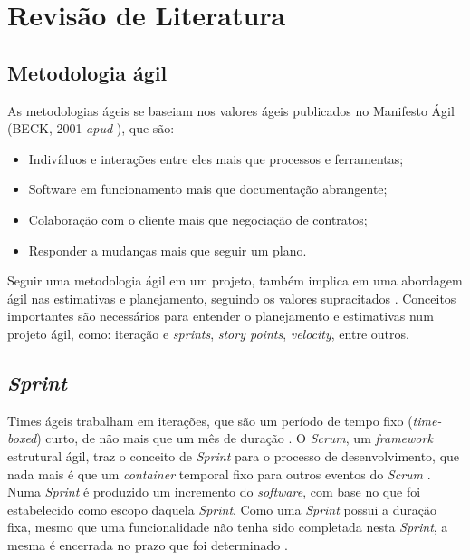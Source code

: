 \chapter{Revisão de Literatura}

  \section{Metodologia ágil}
 
  As metodologias ágeis se baseiam nos valores ágeis publicados no Manifesto Ágil
  (BECK, 2001 \textit{apud} ), que são:
  
  \begin{itemize}
   \item Indivíduos e interações entre eles mais que processos e ferramentas;
   \item Software em funcionamento mais que documentação abrangente;
   \item Colaboração com o cliente mais que negociação de contratos;
   \item Responder a mudanças mais que seguir um plano.
  \end{itemize}
  
 Seguir uma metodologia ágil em um projeto, também implica em uma abordagem ágil nas estimativas e planejamento, seguindo 
 os valores supracitados \cite{cohn06}. Conceitos importantes são necessários para entender o planejamento e estimativas
 num projeto ágil, como: iteração e \textit{sprints}, \textit{story points}, \textit{velocity}, entre outros.
 
 
  \section{\textit{Sprint}}
  
  Times ágeis trabalham em iterações, que são um período de tempo fixo (\textit{time-boxed}) curto, de não mais que
 um mês de duração \cite{cohn06} \cite{scrum13}. O \textit{Scrum}, um \textit{framework} estrutural ágil, 
 traz o conceito de \textit{Sprint} para o processo de desenvolvimento, que nada mais é que um \textit{container} 
 temporal fixo para outros eventos do \textit{Scrum} \cite{scrum13}. Numa \textit{Sprint} é produzido um incremento 
 do \textit{software}, com base no que foi estabelecido como escopo daquela \textit{Sprint}. Como uma \textit{Sprint} possui
 a duração fixa, mesmo que uma funcionalidade não tenha sido completada nesta \textit{Sprint}, a mesma é encerrada no prazo
 que foi determinado \cite{cohn06}.
 
